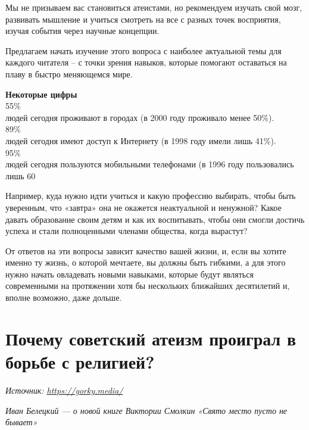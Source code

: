 Мы не призываем вас становиться атеистами, но рекомендуем изучать свой мозг, развивать мышление и учиться смотреть на все с разных точек восприятия, изучая события через научные концепции.

Предлагаем начать изучение этого вопроса с наиболее актуальной темы для каждого читателя – с точки зрения навыков, которые помогают оставаться на плаву в быстро меняющемся мире.

\begin{fancyquotes}
    \textbf{Некоторые цифры}\\

    {\Huge 55\%}\\
    людей сегодня проживают в городах (в 2000 году проживало менее 50\%).\\[1em]

    {\Huge 89\%}\\
    людей сегодня имеют доступ к Интернету (в 1998 году имели лишь 41\%).\\[1em]

    {\Huge 95\%}\\
    людей сегодня пользуются мобильными телефонами (в 1996 году пользовались лишь 60%

\end{fancyquotes}

Например, куда нужно идти учиться и какую профессию выбирать, чтобы быть уверенным, что «завтра» она не окажется неактуальной и ненужной? Какое давать образование своим детям и как их воспитывать, чтобы они смогли достичь успеха и стали полноценными членами общества, когда вырастут?

От ответов на эти вопросы зависит качество вашей жизни, и, если вы хотите именно ту жизнь, о которой мечтаете, вы должны быть гибкими, а для этого нужно начать овладевать новыми навыками, которые будут являться современными на протяжении хотя бы нескольких ближайших десятилетий и, вполне возможно, даже дольше.


\newpage
\section{Почему советский атеизм проиграл в борьбе с религией?}

\textit{Источник: \url{https://gorky.media/}}

\textit{Иван Белецкий --- о новой книге Виктории Смолкин «Свято место пусто не бывает»}

